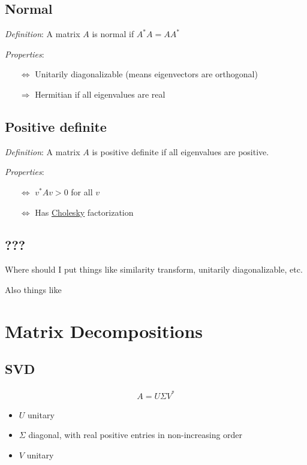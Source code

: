 \documentclass[12pt]{article}
\begin{document}
\subsection{Normal}
\label{sec:normal}
\textit{Definition}: A matrix \( A \) is normal if \( A^*A = AA^* \)

\textit{Properties}:
\begin{itemize}[nolistsep]
    \item[\(\Leftrightarrow\)] Unitarily diagonalizable (means eigenvectors are orthogonal)
    \item[\(\Rightarrow\)] Hermitian if all eigenvalues are real
\end{itemize}


\subsection{Positive definite}
\textit{Definition}: A matrix \( A \) is positive definite if all eigenvalues are positive.

\textit{Properties}:
\begin{itemize}[nolistsep]
    \item[\(\Leftrightarrow\)] \( v^*Av > 0 \) for all \( v \)
    \item[\(\Leftrightarrow\)] Has \hyperref[sec:cholesky]{Cholesky} factorization
\end{itemize}


\subsection{???}
Where should I put things like similarity transform, unitarily diagonalizable, etc.

Also things like 

\pagebreak
\section{Matrix Decompositions}
\subsection{SVD}
\begin{align*}
    A = U\Sigma V^*
\end{align*}

\begin{itemize}[nolistsep]
    \item \( U \) unitary
    \item \( \Sigma \) diagonal, with real positive entries in non-increasing order
    \item \( V \) unitary
\end{itemize}
\end{document}
